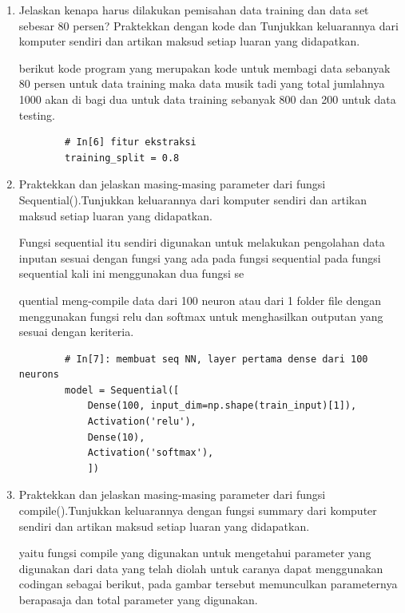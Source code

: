 \begin{enumerate}
		\item Jelaskan kenapa harus dilakukan pemisahan data training dan data set sebesar 80 persen? Praktekkan dengan kode dan Tunjukkan keluarannya dari komputer sendiri dan artikan maksud setiap luaran yang didapatkan.
		\par berikut kode program yang merupakan kode untuk membagi data sebanyak 80 persen untuk data training maka data musik tadi yang total jumlahnya 1000 akan di bagi dua untuk data training sebanyak 800 dan 200 untuk data testing.
		\begin{verbatim} 
		# In[6] fitur ekstraksi
		training_split = 0.8
		\end{verbatim}
		\item Praktekkan dan jelaskan masing-masing parameter dari fungsi Sequential().Tunjukkan keluarannya dari komputer sendiri dan artikan maksud setiap luaran yang didapatkan.
		\par Fungsi sequential itu sendiri digunakan untuk melakukan pengolahan data inputan sesuai dengan fungsi yang ada pada fungsi sequential pada fungsi sequential kali ini menggunakan dua fungsi se\par quential meng-compile data dari 100 neuron atau dari 1 folder ﬁle dengan menggunakan fungsi relu dan softmax untuk menghasilkan outputan yang sesuai dengan keriteria.

		\begin{verbatim}
		# In[7]: membuat seq NN, layer pertama dense dari 100 neurons
		model = Sequential([
		    Dense(100, input_dim=np.shape(train_input)[1]),
		    Activation('relu'),
		    Dense(10),
		    Activation('softmax'),
		    ])
		\end{verbatim}

		\item Praktekkan dan jelaskan masing-masing parameter dari fungsi compile().Tunjukkan keluarannya dengan fungsi summary dari komputer sendiri dan artikan maksud setiap luaran yang didapatkan.
		\par yaitu fungsi compile yang digunakan untuk mengetahui parameter yang digunakan dari data yang telah diolah untuk caranya dapat menggunakan codingan sebagai berikut, pada gambar tersebut memunculkan parameternya berapasaja dan total parameter yang digunakan.


\end{enumerate}
